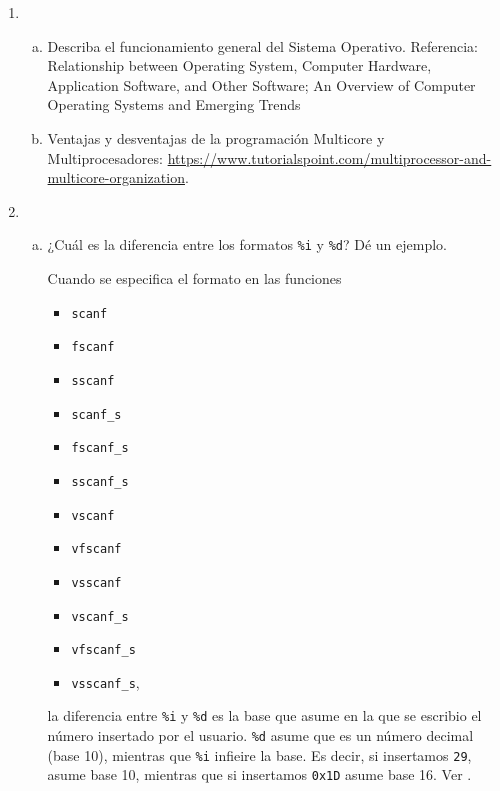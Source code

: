 \documentclass{article}
\begin{document}
	
	\begin{enumerate}
		\item
		\begin{enumerate}[(a)]
			\item Describa el funcionamiento general del Sistema Operativo. Referencia: Relationship between Operating System, Computer Hardware, Application Software, and Other Software; An Overview of Computer Operating Systems and Emerging Trends
			\item Ventajas y desventajas de la programación Multicore y Multiprocesadores: \url{https://www.tutorialspoint.com/multiprocessor-and-multicore-organization}.
			
		\end{enumerate}

	
		\vspace{12pt}
		
		\item
		\begin{enumerate}[(a)]
			\item ¿Cuál es la diferencia entre los formatos \texttt{\%i} y \texttt{\%d}? Dé un ejemplo.
			\begin{mdframed}[
				linecolor=darkgray,
				backgroundcolor=pearl]
				Cuando se especifica el formato en las funciones
				\begin{itemize}
					\item \texttt{scanf}
					\item \texttt{fscanf}
					\item \texttt{sscanf}
					\item \texttt{scanf\_s}
					\item \texttt{fscanf\_s}
					\item \texttt{sscanf\_s}
					\item \texttt{vscanf}
					\item \texttt{vfscanf}
					\item \texttt{vsscanf}
					\item \texttt{vscanf\_s}
					\item \texttt{vfscanf\_s}
					\item \texttt{vsscanf\_s},
				\end{itemize}
				la diferencia entre \texttt{\%i} y \texttt{\%d} es la base que asume en la que se escribio el n\'umero insertado por el usuario. \texttt{\%d} asume que es un n\'umero decimal (base 10), mientras que \texttt{\%i} infieire la base. Es decir, si insertamos \texttt{29}, asume base 10, mientras que si insertamos \texttt{0x1D} asume base 16. Ver  \cite{cppreference:fscanf, cppreference:vfscanf}.
				

\end{mdframed}
\end{enumerate}
\end{enumerate}
\end{document}
